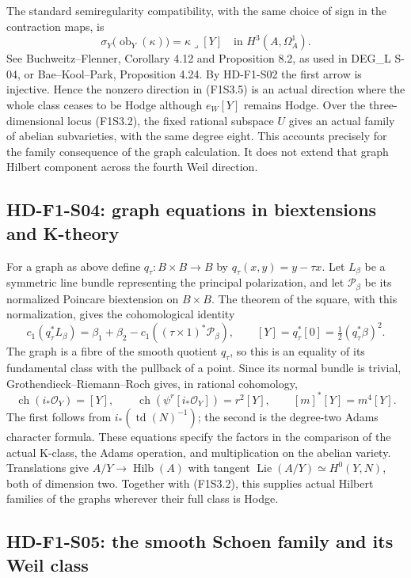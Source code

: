 The standard semiregularity compatibility, with the same choice of
sign in the contraction maps, is
\[
 \sigma_Y\bigl(\operatorname{ob}_Y(\kappa)\bigr)
       =\kappa\mathbin{\lrcorner}[Y]
       \quad\text{in }H^3(A,\Omega_A^1).
 \tag{F1S3.6}
\]
See Buchweitz--Flenner, Corollary 4.12 and Proposition 8.2, as
used in DEG\_L S-04, or Bae--Kool--Park, Proposition 4.24.
By HD-F1-S02 the first arrow is injective. Hence the nonzero
direction in (F1S3.5) is an actual direction where the whole class
ceases to be Hodge although $e_W[Y]$ remains Hodge.
Over the three-dimensional locus (F1S3.2), the fixed rational
subspace $U$ gives an actual family of abelian subvarieties, with
the same degree eight. This accounts precisely for the family
consequence of the graph calculation. It does not extend that
graph Hilbert component across the fourth Weil direction.

\subsection{HD-F1-S04: graph equations in biextensions and K-theory}

For a graph as above define
$q_\tau:B\times B\to B$ by $q_\tau(x,y)=y-\tau x$.
Let $L_\beta$ be a symmetric line bundle representing the principal
polarization, and let $\mathcal P_\beta$ be its normalized
Poincare biextension on $B\times B$. The theorem of the square,
with this normalization, gives the cohomological identity
\[
 c_1(q_\tau^*L_\beta)=\beta_1+\beta_2
        -c_1((\tau\times1)^*\mathcal P_\beta),\qquad
 [Y]=q_\tau^*[0]=\tfrac12(q_\tau^*\beta)^2.
 \tag{F1S4.1}
\]
The graph is a fibre of the smooth quotient $q_\tau$, so this is
an equality of its fundamental class with the pullback of a point.
Since its normal bundle is trivial, Grothendieck--Riemann--Roch
gives, in rational cohomology,
\[
 \operatorname{ch}(i_*\mathcal O_Y)=[Y],\qquad
 \operatorname{ch}(\psi^r[i_*\mathcal O_Y])=r^2[Y],\qquad
 [m]^*[Y]=m^4[Y].
 \tag{F1S4.2}
\]
The first follows from $i_*(\operatorname{td}(N)^{-1})$; the
second is the degree-two Adams character formula. These equations
specify the factors in the comparison of the actual K-class,
the Adams operation, and multiplication on the abelian variety.
Translations give $A/Y\to\operatorname{Hilb}(A)$ with tangent
$\operatorname{Lie}(A/Y)\simeq H^0(Y,N)$, both of dimension two.
Together with (F1S3.2), this supplies actual Hilbert families of
the graphs wherever their full class is Hodge.

\subsection{HD-F1-S05: the smooth Schoen family and its Weil class}

